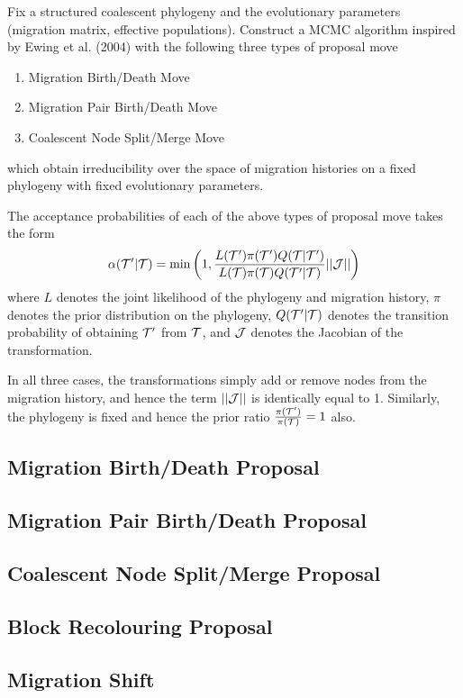 Fix a structured coalescent phylogeny and the evolutionary parameters (migration matrix, effective populations). Construct a MCMC algorithm inspired by Ewing et al. (2004) with the following three types of proposal move
	\begin{enumerate}
		\item Migration Birth/Death Move
		\item Migration Pair Birth/Death Move
		\item Coalescent Node Split/Merge Move
	\end{enumerate}
which obtain irreducibility over the space of migration histories on a fixed phylogeny with fixed evolutionary parameters.

The acceptance probabilities of each of the above types of proposal move takes the form
	\begin{equation}
		\alpha(\mathcal{T}' | \mathcal{T}) = \min \left( 1, \frac{L(\mathcal{T}') \pi(\mathcal{T}') Q(\mathcal{T} | \mathcal{T}')}{L(\mathcal{T}) \pi(\mathcal{T}) Q(\mathcal{T}' | \mathcal{T})} || \mathcal{J} || \right)
	\end{equation}
where $L$ denotes the joint likelihood of the phylogeny and migration history, $\pi$ denotes the prior distribution on the phylogeny, $Q(\mathcal{T}' | \mathcal{T})$ denotes the transition probability of obtaining $\mathcal{T}'$ from $\mathcal{T}$, and $\mathcal{J}$ denotes the Jacobian of the transformation.

In all three cases, the transformations simply add or remove nodes from the migration history, and hence the term $||\mathcal{J}||$ is identically equal to 1. Similarly, the phylogeny is fixed and hence the prior ratio $\frac{\pi(\mathcal{T}')}{\pi(\mathcal{T})} = 1$ also.

\subsection{Migration Birth/Death Proposal}
	
	
\subsection{Migration Pair Birth/Death Proposal}
	
	
\subsection{Coalescent Node Split/Merge Proposal}
	
	
\subsection{Block Recolouring Proposal}
	
	
\subsection{Migration Shift}
	